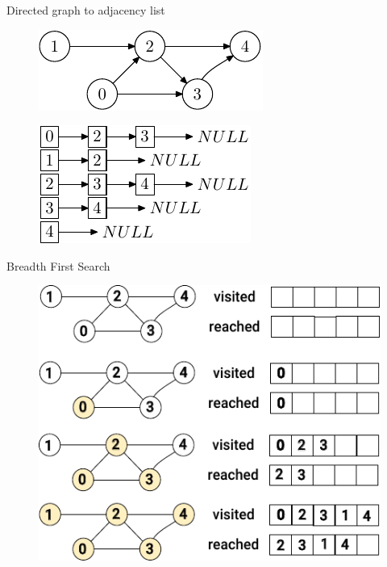 \documentclass[aspectratio=169,8pt]{beamer}
\begin{document}
\begin{frame}[fragile]{Directed graph to adjacency list}
  \begin{center}
    \begin{figure}
      \includegraphics{di-graph}
    \end{figure}
    \begin{figure}
      \includegraphics{di-adj-list}
    \end{figure}
  \end{center}
\end{frame}
\begin{frame}[fragile]{Breadth First Search}
  \begin{center}
    \begin{figure}
      \includegraphics{bfs}
    \end{figure}
  \end{center}
\end{frame}
\end{document}
